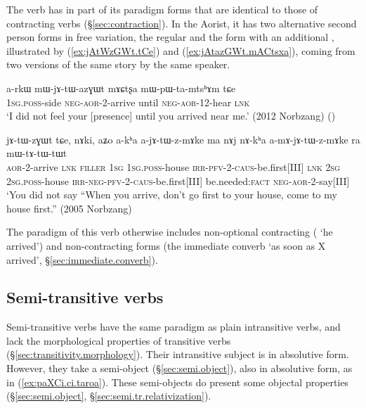 The verb  has in part of its paradigm forms that are identical to those of contracting verbs (§\ref{sec:contraction}). In the Aorist, it has two alternative second person forms in free variation, the regular  and the form  with an additional , illustrated by (\ref{ex:jAtWzGWt.tCe}) and  (\ref{ex:jAtazGWt.mACtsxa}), coming from two versions of the same story by the same speaker. 

\begin{exe}
\ex \label{ex:jAtazGWt.mACtsxa}
\gll  a-rkɯ mɯ-jɤ-tɯ-azɣɯt mɤɕtʂa mɯ-pɯ-ta-mtsʰɤm tɕe \\
\textsc{1sg}.\textsc{poss}-side \textsc{neg}-\textsc{aor}-2-arrive until \textsc{neg}-\textsc{aor}-1\fl{}2-hear \textsc{lnk} \\
\glt `I did not feel your [presence] until you arrived near me.' (2012 Norbzang) ()
\end{exe}

\begin{exe}
\ex \label{ex:jAtWzGWt.tCe}
\gll jɤ-tɯ-zɣɯt tɕe, nɤki, aʑo a-kʰa a-jɤ-tɯ-z-mɤke ma nɤj nɤ-kʰa a-mɤ-jɤ-tɯ-z-mɤke ra mɯ-tɤ-tɯ-tɯt \\
\textsc{aor}-2-arrive \textsc{lnk} \textsc{filler} \textsc{1sg} \textsc{1sg}.\textsc{poss}-house \textsc{irr}-\textsc{pfv}-2-\textsc{caus}-be.first[III] \textsc{lnk} 
\textsc{2sg} \textsc{2sg}.\textsc{poss}-house \textsc{irr}-\textsc{neg}-\textsc{pfv}-2-\textsc{caus}-be.first[III] be.needed:\textsc{fact} \textsc{neg}-\textsc{aor}-2-say[III] \\
\glt `You did not say ``When you arrive, don't go first to your house, come to my house first.'' (2005 Norbzang)
\end{exe}

The paradigm of this verb otherwise includes non-optional contracting ( `he arrived') and non-contracting forms (the immediate converb  `as soon as X arrived', §\ref{sec:immediate.converb}).

\subsection{Semi-transitive verbs} \label{sec:semi.transitive}
Semi-transitive verbs have the same paradigm as plain intransitive verbs, and lack the morphological properties of transitive verbs (§\ref{sec:transitivity.morphology}). Their intransitive subject is in absolutive form. However, they take a semi-object (§\ref{sec:semi.object}), also in absolutive form, as  in (\ref{ex:paXCi.ci.taroa}). These semi-objects do present some objectal properties (§\ref{sec:semi.object}, §\ref{sec:semi.tr.relativization}).
 
